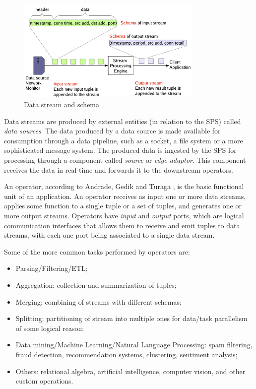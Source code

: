 \documentclass[ppgc,diss,english]{iiufrgs}
\begin{document}
\begin{figure}[!ht]
	\centering
	\includegraphics[width=0.8\textwidth]{images/streams_schemas.png}
	\caption[Data stream and schema]{Data stream and schema \cite{balazinska2005fault}}
	\label{fig:sps_data_stream}
\end{figure}

Data streams are produced by external entities (in relation to the SPS) called \emph{data sources}. The data produced by a data source is made available for consumption through a data pipeline, such as a socket, a file system or a more sophisticated message system. The produced data is ingested by the SPS for processing through a component called \emph{source} or \emph{edge adaptor}. This component receives the data in real-time and forwards it to the downstream operators.

An operator, according to Andrade, Gedik and Turaga \cite{andrade2014fundamentals}, is the basic functional unit of an application. An operator receives as input one or more data streams, applies some function to a single tuple or a set of tuples, and generates one or more output streams. Operators have \emph{input} and \emph{output} ports, which are logical communication interfaces that allows them to receive and emit tuples to data streams, with each one port being associated to a single data stream.

Some of the more common tasks performed by operators are:

\begin{itemize}
\item Parsing/Filtering/ETL;
\item Aggregation: collection and summarization of tuples;
\item Merging: combining of streams with different schemas;
\item Splitting: partitioning of stream into multiple ones for data/task parallelism of some logical reason;
\item Data mining/Machine Learning/Natural Language Processing: spam filtering, fraud detection, recommendation systems, clustering, sentiment analysis;
\item Others: relational algebra, artificial intelligence, computer vision, and other custom operations.
\end{itemize}
\end{document}
